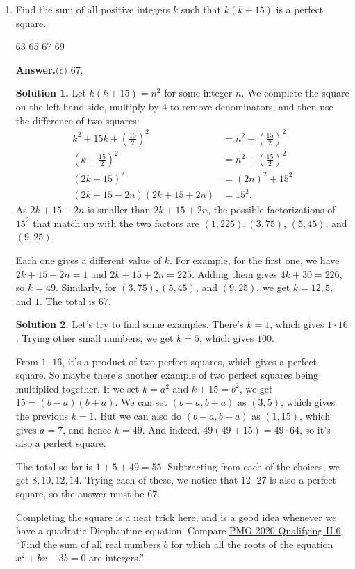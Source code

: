 \documentclass[11pt,paper=letter]{scrartcl}
\newcommand{\ans}{{\sffamily \bfseries Answer.}\;}
\newcommand{\ansb}[2]{\ans\(\boxed{\text{(#1) #2}}\).}
\newcommand{\soln}[1]{{\sffamily \bfseries Solution #1.}\;}
\newenvironment{rem}%
{\noindent \ignorespaces \small \sffamily \sansmath {\bfseries Remark.}}%
{\ignorespacesafterend}
\begin{document}
\begin{enumerate}[left=0pt]
\item Find the sum of all positive integers $k$ such that $k(k+15)$ is a perfect square.

\fourch
{$63$}
{$65$}
{$67$}
{$69$}

\ansb{c}{$67$}

\soln1 Let $k(k+15) = n^2$ for some integer $n$. We complete the square on the left-hand side, multiply by $4$ to remove denominators, and then use the difference of two squares:
\begin{align*}
k^2 + 15k + \left(\frac{15}{2}\right)^2 &= n^2 + \left(\frac{15}{2}\right)^2  \\
\left(k + \frac{15}{2}\right)^2 &= n^2 + \left(\frac{15}{2}\right)^2  \\
\left(2k + 15\right)^2 &= (2n)^2 + 15^2 \\
(2k + 15 - 2n)(2k + 15 + 2n) &= 15^2.
\end{align*}
As $2k + 15 - 2n$ is smaller than $2k + 15 + 2n$, the possible factorizations of $15^2$ that match up with the two factors are $(1, 225), (3, 75)$, $(5, 45)$, and $(9, 25)$.

Each one gives a different value of $k$. For example, for the first one, we have $2k + 15 - 2n = 1$ and $2k + 15 + 2n = 225$. Adding them gives $4k + 30 = 226$, so $k = 49$. Similarly, for $(3, 75), (5, 45)$, and $(9, 25)$, we get $k = 12, 5,$ and $1$. The total is $67$.

\soln2 Let's try to find some examples. There's $k = 1$, which gives $1 \cdot 16$. Trying other small numbers, we get $k = 5$, which gives $100$.

From $1 \cdot 16$, it's a product of two perfect squares, which gives a perfect square. So maybe there's another example of two perfect squares being multiplied together. If we set $k = a^2$ and $k + 15 = b^2$, we get $15 = (b-a)(b+a)$. We can set $(b-a, b+a)$ as $(3, 5)$, which gives the previous $k = 1$. But we can also do $(b-a, b+a)$ as $(1, 15)$, which gives $a = 7$, and hence $k = 49$. And indeed, $49(49 + 15) = 49 \cdot 64$, so it's also a perfect square.

The total so far is $1 + 5 + 49 = 55$. Subtracting from each of the choices, we get $8, 10, 12, 14$. Trying each of these, we notice that $12 \cdot 27$ is also a perfect square, so the answer must be $67$.

\begin{rem}
Completing the square is a neat trick here, and is a good idea whenever we have a quadratic Diophantine equation. Compare \href{https://cjquines.com/files/pmo2020quals.pdf}{PMO 2020 Qualifying II.6}, ``Find the sum of all real numbers $b$ for which all the roots of the equation $x^2 + bx - 3b = 0$ are integers.''
\end{rem}


\end{enumerate}
\end{document}
